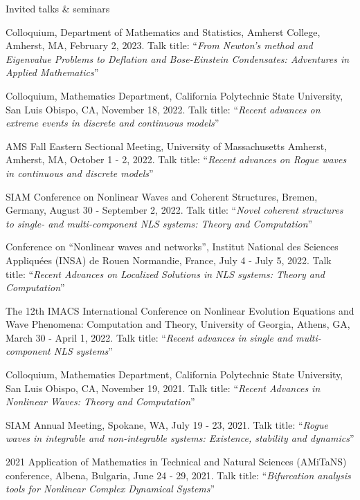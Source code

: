 \documentclass[10pt]{article} %
\newenvironment{innerlist}[1][\enskip\textbullet]%
        {\begin{compactitem}[#1]}{\end{compactitem}}
\begin{document}
\begin{section}{Invited talks \& seminars}
\begin{innerlist}
\item Colloquium, Department of Mathematics and Statistics, Amherst College, Amherst, MA, February 2, 2023. 
Talk title: ``\textit{From Newton's method and Eigenvalue Problems to Deflation and Bose-Einstein 
Condensates: Adventures in Applied Mathematics}''


\item Colloquium, Mathematics Department, California Polytechnic State University, San Luis Obispo, CA, November 18, 2022. 
Talk title: ``\textit{Recent advances on extreme events in discrete and continuous models}''

\item AMS Fall Eastern Sectional Meeting, University of Massachusetts Amherst, Amherst, MA, October 1 - 2, 2022.
Talk title: ``\textit{Recent advances on Rogue waves in continuous and discrete models}''

\item SIAM Conference on Nonlinear Waves and Coherent Structures, Bremen, Germany, August 30 - September 2, 2022.
Talk title: ``\textit{Novel coherent structures to single- and multi-component NLS systems: Theory and Computation}''

\item Conference on ``Nonlinear waves and networks'', Institut National des Sciences Appliqu\'ees %
(INSA) de Rouen Normandie, France, July 4 - July 5, 2022. %
Talk title: ``\textit{Recent Advances on Localized Solutions in NLS systems: Theory and Computation}''

\item The 12th IMACS International Conference on Nonlinear Evolution Equations and Wave Phenomena: Computation and Theory, %
        University of Georgia, Athens, GA, March 30 - April 1, 2022. 
        Talk title: ``\textit{Recent advances in single and multi-component NLS systems}''

\item Colloquium, Mathematics Department, California Polytechnic State University, San Luis Obispo, CA, November 19, 2021. 
Talk title: ``\textit{Recent Advances in Nonlinear Waves: Theory and Computation}'' 
        
\item SIAM Annual Meeting, Spokane, WA, July 19 - 23, 2021. Talk title: 
``\textit{Rogue waves in integrable and non-integrable systems: Existence, stability and dynamics}''

\item 2021 Application of Mathematics in Technical and Natural Sciences (AMiTaNS) conference, Albena, Bulgaria, June 24 - 29, 2021.
Talk title: ``\textit{Bifurcation analysis tools for Nonlinear Complex Dynamical Systems}''


\end{innerlist}
\end{section}
\end{document}
